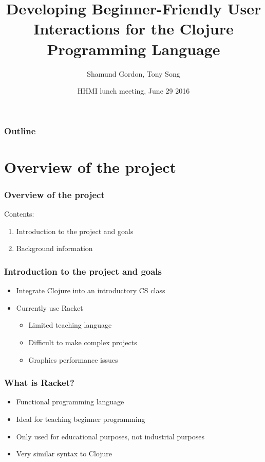 \documentclass{beamer}
\begin{document}
\title{Developing Beginner-Friendly User Interactions for the Clojure Programming Language}
\author{Shamund Gordon, Tony Song}
\date[]  
{HHMI lunch meeting, June 29 2016}

\begin{frame}
  \titlepage
\end{frame}


\begin{frame}

\frametitle{Outline}
\tableofcontents
\end{frame}

\section{Overview of the project}

\begin{frame}
  \frametitle{Overview of the project}
Contents:
\begin{enumerate}
\item Introduction to the project and goals
\item Background information
\end{enumerate}
\end{frame}

\begin{frame}
	\frametitle{Introduction to the project and goals}
	\begin{itemize}
		\item Integrate Clojure into an introductory CS class
		\item Currently use Racket
		\begin{itemize}
			\item Limited teaching language
			\item Difficult to make complex projects
			\item Graphics performance issues 
		\end{itemize}
	\end{itemize}
\end{frame}

\begin{frame}
	\frametitle{What is Racket?}
	\begin{itemize}
		\item Functional programming language
		\item Ideal for teaching beginner programming
		\item Only used for educational purposes, not industrial purposes
		\item Very similar syntax to Clojure
	\end{itemize}
\end{frame}
\end{document}
